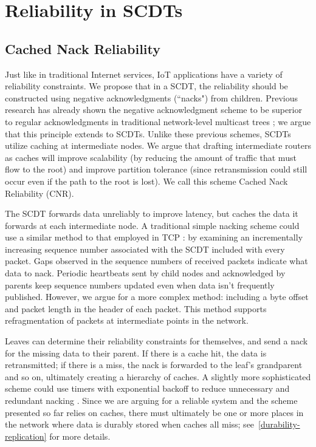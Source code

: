 \chapter{Reliability in SCDTs}

\section{Cached Nack Reliability}
Just like in traditional Internet services, IoT applications have a variety of
reliability constraints.  We propose that in a SCDT, the reliability should be
constructed using negative acknowledgments (``nacks") from children.  Previous
research has already shown the negative acknowledgment scheme to be superior to
regular acknowledgments in traditional network-level multicast trees
\cite{SRM, RFC3208}; we argue that this principle extends to SCDTs.
Unlike these previous schemes, SCDTs utilize caching at intermediate nodes.  We
argue that drafting intermediate routers as caches will improve scalability (by
reducing the amount of traffic that must flow to the root) and improve partition
tolerance (since retransmission could still occur even if the path to the root
is lost).  We call this scheme Cached Nack Reliability (CNR).

The SCDT forwards data unreliably to improve latency, but caches the data it
forwards at each intermediate node.  A traditional simple nacking scheme could use a similar method to that employed in TCP \cite{RFC0793}: by examining an incrementally increasing sequence number associated with the SCDT included with every packet.  Gaps observed in the sequence numbers of received packets indicate what data to nack.  Periodic heartbeats sent by child nodes and acknowledged by parents keep sequence numbers updated even when data isn't frequently published.  However, we argue for a more complex method: including a byte offset and packet length in the header of each packet.  This method supports refragmentation of packets at intermediate points in the network.

Leaves can determine their reliability constraints for themselves, and send a
nack for the missing data to their parent.  If there is a cache hit, the data is
retransmitted; if there is a miss, the nack is forwarded to the leaf's
grandparent and so on, ultimately creating a hierarchy of caches.  A slightly
more sophisticated scheme could use timers with exponential backoff to reduce
unnecessary and redundant nacking \cite{SRM, RFC3208}.  Since we are
arguing for a reliable system and the scheme presented so far relies on caches,
there must ultimately be one or more places in the network where data is durably
stored when caches all miss; 
see~\autoref{durability-replication} for more
details.


